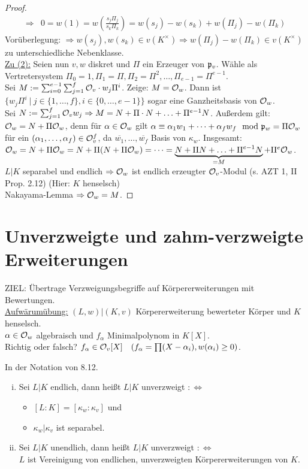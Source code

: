 \begin{proof}
\begin{align*}
\Rightarrow & 0 = w(1)=w(\frac{s_j\Pi_j}{s_k\Pi_k})= w(s_j)-w(s_k)+w(\Pi_j)-w(\Pi_k)
\end{align*}
Vorüberlegung: $\Rightarrow w(s_j), w(s_k) \in v(K^\times) \Rightarrow w(\Pi_j)-w(\Pi_k) \in v(K^\times)$ \Lightning zu unterschiedliche Nebenklasse.\\
\underline{Zu (2):} Seien nun $v,w$ diskret und $\Pi$ ein Erzeuger von $\mathfrak{p}_v$. Wähle als Vertretersystem $\Pi_0=1, \Pi_1=\Pi, \Pi_2=\Pi^2, \dots, \Pi_{e-1}=\Pi^{e-1}$.\\
Sei $M:= \sum_{i=0}^{e-1} \sum_{j=1}^f \mathcal{O}_v \cdot w_j \Pi^i$. Zeige: $M= \mathcal{O}_w$. Dann ist $\{w_j\Pi^i \ | \ j \in \{1, \ldots, f\}, i \in \{0, \ldots, e-1\}\}$ sogar eine Ganzheitsbasis von $\mathcal{O}_w$.\\
Sei $N:= \sum_{j=1}^f \mathcal{O}_vw_j \Rightarrow M=N + \Pi\cdot N + \ldots + \Pi^{e-1}N$. Außerdem gilt: $\mathcal{O}_w = N+ \Pi \mathcal{O}_w$, denn für $\alpha \in \mathcal{O}_w$ gilt $\alpha \equiv \alpha_1 w_1 + \dots + \alpha_f w_f \mod {\mathfrak{p}}_w=\Pi\mathcal{O}_w$ für ein $(\alpha_1, \dots, \alpha_f) \in \mathcal{O}_v^f$, da $\overline{w_1}, \dots, \overline{w_f}$ Basis von $\kappa_w$. Insgesamt: $\mathcal{O}_w=N+\Pi \mathcal{O}_w= N+ \Pi(N+\Pi\mathcal{O}_w)= \dots = \underbrace{N+\Pi N + \ldots + \Pi^{e-1} N}_{=M} +\Pi^e \mathcal{O}_w$.\\
$L|K$ separabel und endlich $\Rightarrow \mathcal{O}_w$ ist endlich erzeugter $\mathcal{O}_v$-Modul (s. AZT 1, II Prop. 2.12) (Hier: $K$ henselsch)\\
Nakayama-Lemma $\Rightarrow \mathcal{O}_w=M$.
\end{proof}


\section{Unverzweigte und zahm-verzweigte Erweiterungen}
ZIEL: Übertrage Verzweigungsbegriffe auf Körpererweiterungen mit Bewertungen.\\
\underline{Aufwärumübung:} $(L,w)|(K,v)$ Körpererweiterung bewerteter Körper und $K$ henselsch.\\
$\alpha \in \mathcal{O}_w$ algebraisch und $f_\alpha$ Minimalpolynom in $K[X]$.\\
Richtig oder falsch? $f_\alpha \in \mathcal{O}_v[X] \quad  (f_\alpha = \prod (X-\alpha_i), w(\alpha_i)\geq 0)$.

\begin{defi}
In der Notation von 8.12.
\begin{enumerate}[i)]
\item Sei $L|K$ endlich, dann heißt $L|K$ unverzweigt $: \iff$
\begin{itemize}
\item $[L:K]=[\kappa_w:\kappa_v]$ und
\item $\kappa_w | \kappa_v$ ist separabel.
\end{itemize}
\item Sei $L|K$ unendlich, dann heißt $L|K$ unverzweigt $:\iff$\\
\hspace*{0.2cm}$L$ ist Vereinigung von endlichen, unverzweigten Körpererweiterungen von $K$.
\end{enumerate}
\end{defi}

